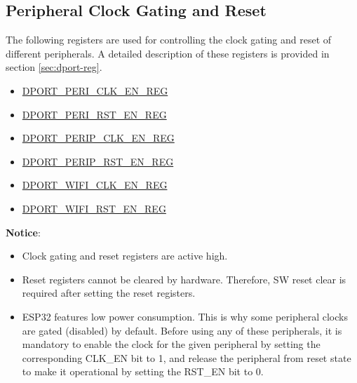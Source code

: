 \documentclass[main\_\_EN.tex]{subfiles}
\begin{document}
\subsection{Peripheral Clock Gating and Reset}\label{sec:peri-clock-gating-reset}

The following registers are used for controlling the clock gating and reset of different peripherals. A detailed description of these registers is provided in section \ref{sec:dport-reg}.

\begin{itemize}
    \item \hyperref[regdesc:PERICLKENREG]{DPORT\_PERI\_CLK\_EN\_REG}
    \item \hyperref[regdesc:PERIRSTENREG]{DPORT\_PERI\_RST\_EN\_REG}
    \item \hyperref[regdesc:PERIPCLKENREG]{DPORT\_PERIP\_CLK\_EN\_REG}
    \item \hyperref[regdesc:PERIPRSTENREG]{DPORT\_PERIP\_RST\_EN\_REG}
    \item \hyperref[regdesc:WIFICLKENREG]{DPORT\_WIFI\_CLK\_EN\_REG}
    \item \hyperref[regdesc:WIFIRSTENREG]{DPORT\_WIFI\_RST\_EN\_REG}
\end{itemize}

\textbf{Notice}:
\begin{itemize}
    \item Clock gating and reset registers are active high.
    \item Reset registers cannot be cleared by hardware. Therefore, SW reset clear is required after setting the reset registers.
    \item ESP32 features low power consumption. This is why some peripheral clocks are gated (disabled) by default. Before using any of these peripherals, it is mandatory to enable the clock for the given peripheral by setting the corresponding CLK\_EN bit to 1, and release the peripheral from reset state to make it operational by setting the RST\_EN bit to 0.

\end{itemize}

\hypertarget{dportreg-reg-summ}{}



\end{document}
